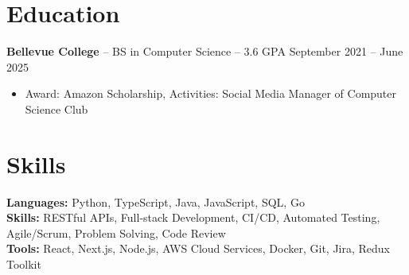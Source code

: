 \documentclass[11pt]{article}       %
\begin{document}

\vspace{-18.5pt}

\section*{Education}
\textbf{Bellevue College} -- BS in Computer Science -- 3.6 GPA \hfill September 2021 -- June 2025\\
\vspace{-9pt}
\begin{itemize}
  \item Award: Amazon Scholarship, Activities: Social Media Manager of Computer Science Club
\end{itemize}

\vspace{-18.5pt}

\section*{Skills}
\textbf{Languages:} Python, TypeScript, Java, JavaScript, SQL, Go\\
\textbf{Skills:} RESTful APIs, Full-stack Development, CI/CD, Automated Testing, Agile/Scrum, Problem Solving, Code Review\\
\textbf{Tools:} React, Next.js, Node.js, AWS Cloud Services, Docker, Git, Jira, Redux Toolkit

\vspace{-6.5pt}
\end{document}
